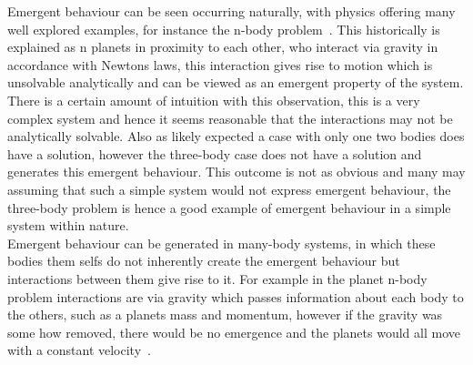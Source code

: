 \documentclass{article}
\begin{document}
Emergent behaviour can be seen occurring naturally, with physics offering many well explored examples, for instance the n-body problem~\cite{nbodyproblem}. This historically is explained as n planets in proximity to each other, who interact via gravity in accordance with Newtons laws, this interaction gives rise to motion which is unsolvable analytically and can be viewed as an emergent property of the system. There is a certain amount of intuition with this observation, this is a very complex system and hence it seems reasonable that the interactions may not be analytically solvable. Also as likely expected a case with only one two bodies does have a solution, however the three-body case does not have a solution and generates this emergent behaviour. This outcome is not as obvious and many may assuming that such a simple system would not express emergent behaviour, the three-body problem is hence a good example of emergent behaviour in a simple system within nature.\\     
Emergent behaviour can be generated in many-body systems, in which these bodies them selfs do not inherently create the emergent behaviour but interactions between them give rise to it. For example in the planet n-body problem interactions are via gravity which passes information about each body to the others, such as a planets mass and momentum, however if the gravity was some how removed, there would be no emergence and the planets would all move with a constant velocity~\cite{newtonconstantvelocity}.
\end{document}
